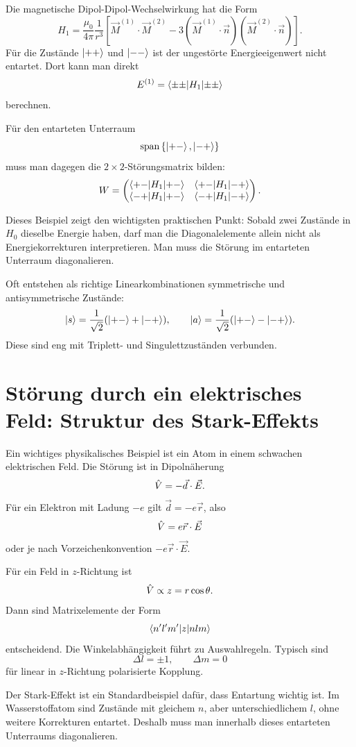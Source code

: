 Die magnetische Dipol-Dipol-Wechselwirkung hat die Form
\[
    H_1=\frac{\mu_0}{4\pi}\frac{1}{r^3}
    \left[
        \vec M^{(1)}\cdot\vec M^{(2)}
        -3(\vec M^{(1)}\cdot\vec n)(\vec M^{(2)}\cdot\vec n)
    \right].
\]
Für die Zustände \(\left|++\right\rangle\) und \(\left|--\right\rangle\) ist der ungestörte Energieeigenwert nicht entartet. Dort kann man direkt
\[
    E^{(1)}=\left\langle\pm\pm\middle|H_1\middle|\pm\pm\right\rangle
\]
berechnen.

Für den entarteten Unterraum
\[
    \operatorname{span}\left\{ \left|+-\right\rangle,\left|-+\right\rangle \right\}
\]
muss man dagegen die \(2\times2\)-Störungsmatrix bilden:
\[
    W=\begin{pmatrix}
        \left\langle+-\middle|H_1\middle|+-\right\rangle & \left\langle+-\middle|H_1\middle|-+\right\rangle\\
        \left\langle-+\middle|H_1\middle|+-\right\rangle & \left\langle-+\middle|H_1\middle|-+\right\rangle
    \end{pmatrix}.
\]

\begin{conceptbox}
Dieses Beispiel zeigt den wichtigsten praktischen Punkt: Sobald zwei Zustände in \(H_0\) dieselbe Energie haben, darf man die Diagonalelemente allein nicht als Energiekorrekturen interpretieren. Man muss die Störung im entarteten Unterraum diagonalieren.
\end{conceptbox}

Oft entstehen als richtige Linearkombinationen symmetrische und antisymmetrische Zustände:
\[
    \left|s\right\rangle=\frac{1}{\sqrt2}(\left|+-\right\rangle+\left|-+\right\rangle),
    \qquad
    \left|a\right\rangle=\frac{1}{\sqrt2}(\left|+-\right\rangle-\left|-+\right\rangle).
\]
Diese sind eng mit Triplett- und Singulettzuständen verbunden.

\section{Störung durch ein elektrisches Feld: Struktur des Stark-Effekts}

Ein wichtiges physikalisches Beispiel ist ein Atom in einem schwachen elektrischen Feld. Die Störung ist in Dipolnäherung
\[
    \hat V=-\vec d\cdot\vec E.
\]
Für ein Elektron mit Ladung \(-e\) gilt \(\vec d=-e\vec r\), also
\[
    \hat V=e\vec r\cdot\vec E
\]
oder je nach Vorzeichenkonvention \(-e\vec r\cdot\vec E\).

Für ein Feld in \(z\)-Richtung ist
\[
    \hat V\propto z=r\cos\theta.
\]
Dann sind Matrixelemente der Form
\[
    \left\langle n'l'm'\middle|z\middle|nlm\right\rangle
\]
entscheidend. Die Winkelabhängigkeit führt zu Auswahlregeln. Typisch sind
\[
    \Delta l=\pm 1,
    \qquad
    \Delta m=0
\]
für linear in \(z\)-Richtung polarisierte Kopplung.

\begin{notebox}
Der Stark-Effekt ist ein Standardbeispiel dafür, dass Entartung wichtig ist. Im Wasserstoffatom sind Zustände mit gleichem \(n\), aber unterschiedlichem \(l\), ohne weitere Korrekturen entartet. Deshalb muss man innerhalb dieses entarteten Unterraums diagonalieren.
\end{notebox}

